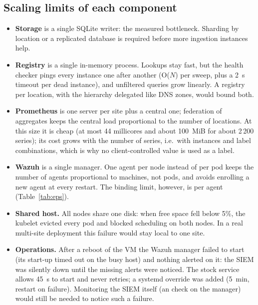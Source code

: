 \subsection{Scaling limits of each component}

\begin{itemize}
  \item \textbf{Storage} is a single SQLite writer: the measured bottleneck. Sharding by location or a
        replicated database is required before more ingestion instances help.
  \item \textbf{Registry} is a single in-memory process. Lookups stay fast, but the health checker
        pings every instance one after another (O($N$) per sweep, plus a 2~s timeout per dead
        instance), and unfiltered queries grow linearly. A registry per location, with the
        hierarchy delegated like DNS zones, would bound both.
  \item \textbf{Prometheus} is one server per site plus a central one; federation of aggregates keeps
        the central load proportional to the number of locations. At this size it is cheap (at most
        44 millicores and about 100~MiB for about 2\,200 series); its cost grows with the number of
        series, i.e.\ with instances and label combinations, which is why no client-controlled value
        is used as a label.
  \item \textbf{Wazuh} is a single manager. One agent per node instead of per pod keeps the number of
        agents proportional to machines, not pods, and avoids enrolling a new agent at every
        restart. The binding limit, however, is per agent (Table~\ref{tab:eps}).
  \item \textbf{Shared host.} All nodes share one disk: when free space fell below 5\%, the kubelet
        evicted every pod and blocked scheduling on both nodes. In a real multi-site deployment
        this failure would stay local to one site.
  \item \textbf{Operations.} After a reboot of the VM the Wazuh manager failed to start (its start-up
        timed out on the busy host) and nothing alerted on it: the SIEM was silently down until the
        missing alerts were noticed. The stock service allows 45~s to start and never retries; a
        systemd override was added (5~min, restart on failure). Monitoring the SIEM itself (an 
        check on the manager) would still be needed to notice such a failure.
\end{itemize}
